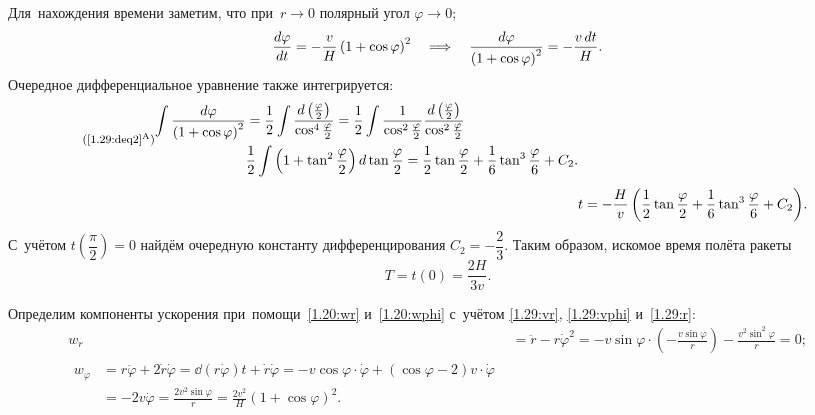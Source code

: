 \documentclass{weekly}
\begin{document}
Для~нахождения времени заметим, что при~$r \to 0$
полярный угол $\varphi \to 0$;
\begin{align}
    \frac{d \varphi}{d t} = -\frac{v}{H} \left(1+\cos\varphi\right)^2 \quad \Longrightarrow \quad
    \frac{d\varphi}{\left(1+\cos\varphi\right)^2} = -\frac{v\,dt}{H}.
        \label{1.29:deq2}
\end{align}
Очередное дифференциальное уравнение также интегрируется:
\begin{align}
\tag*{\footnotesize(\ref{1.29:deq2}$^\text{A}$)}
\begin{split}
    \int \frac{d\varphi}{\left(1+\cos\varphi\right)^2}
        &= \frac{1}{2} \int \frac{d\left(\frac{\varphi}{2}\right)}
            {\cos^4 \frac{\varphi}{2}}
        = \frac{1}{2} \int \frac{1}{\cos^2 \frac{\varphi}{2}}
            \frac{d\left(\frac{\varphi}{2}\right)}
            {\cos^2 \frac{\varphi}{2}} \\
        & \frac{1}{2} \int \left(1 + \tan^2 \frac{\varphi}{2}\right)
            d\tan\frac{\varphi}{2}
        = \frac{1}{2}\tan\frac{\varphi}{2} +
            \frac{1}{6}\tan^3\frac{\varphi}{6} + C_2.
\end{split} \\[1ex]
    &t = -\frac{H}{v} \left( \frac{1}{2}\tan\frac{\varphi}{2} +
            \frac{1}{6}\tan^3\frac{\varphi}{6} + C_2 \right)\!.
\end{align}
С~учётом $t\!\left(\dfrac{\pi}{2}\right) = 0$ найдём
очередную константу дифференцирования $C_2 = -\dfrac{2}{3}$.
Таким образом, искомое время полёта ракеты
\begin{equation}
    T = t(0) = \frac{2H}{3v}.
\end{equation}

Определим компоненты ускорения при~помощи~\eqref{1.20:wr}
и~\eqref{1.20:wphi} с~учётом \eqref{1.29:vr}, \eqref{1.29:vphi}
и~\eqref{1.29:r}:
\begin{align}
    w_r &= \ddot r - r \dot\varphi^2 = -v \sin\varphi \cdot
            \left(-\frac{v \sin\varphi}{r}\right) -
            \frac{v^2 \sin^2\varphi}{r} = 0; \\
\begin{split}
    w_\varphi &= r \ddot\varphi + 2 \dot r \dot\varphi
        = \dd{(r \dot\varphi)}{t} + \dot r \dot\varphi
        = -v \cos\varphi \cdot \dot\varphi +
            (\cos\varphi - 2) v \cdot \dot\varphi \\
        &= -2v \dot\varphi = \frac{2v^2 \sin\varphi}{r}
        = \frac{2v^2}{H} \left( 1 + \cos\varphi \right)^2.
\end{split}
\end{align}
\end{document}
